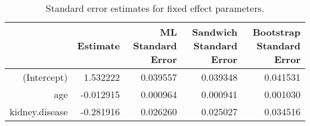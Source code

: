 \begin{table}[ht]
\centering
\begingroup\small
\begin{tabular}{rrrrr}
  \toprule
 & Estimate & ML Standard Error & Sandwich Standard Error & Bootstrap Standard Error \\ 
  \midrule
(Intercept) & 1.532222 & 0.039557 & 0.039348 & 0.041531 \\ 
  age & -0.012915 & 0.000964 & 0.000941 & 0.001030 \\ 
  kidney.disease & -0.281916 & 0.026260 & 0.025027 & 0.034516 \\ 
   \bottomrule
\end{tabular}
\endgroup
\caption{Standard error estimates for fixed effect parameters.} 
\label{tab:standard_errors_no_interaction}
\end{table}
